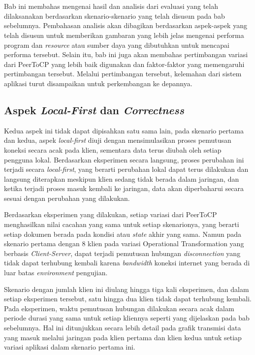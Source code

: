 \chapter{\babLima}
\label{bab:5}

Bab ini membahas mengenai hasil dan analisis dari evaluasi yang telah dilaksanakan berdasarkan skenario-skenario yang telah disusun pada bab sebelumnya. Pembahasan analisis akan dibagikan berdasarkan aspek-aspek yang telah disusun untuk memberikan gambaran yang lebih jelas mengenai performa program dan \textit{resource} atau sumber daya yang dibutuhkan untuk mencapai performa tersebut. Selain itu, bab ini juga akan membahas pertimbangan variasi dari PeerToCP yang lebih baik digunakan dan faktor-faktor yang memengaruhi pertimbangan tersebut. Melalui pertimbangan tersebut, kelemahan dari sistem aplikasi turut disampaikan untuk perkembangan ke depannya.

\section{Aspek \textit{Local-First} dan \textit{Correctness}}

Kedua aspek ini tidak dapat dipisahkan satu sama lain, pada skenario pertama dan kedua, aspek \textit{local-first} diuji dengan mensimulasikan proses pemutusan koneksi secara acak pada klien, sementara data terus diubah oleh setiap pengguna lokal. Berdasarkan eksperimen secara langsung, proses perubahan ini terjadi secara \textit{local-first}, yang berarti perubahan lokal dapat terus dilakukan dan langsung diterapkan meskipun klien sedang tidak berada dalam jaringan, dan ketika terjadi proses masuk kembali ke jaringan, data akan diperbaharui secara sesuai dengan perubahan yang dilakukan.

Berdasarkan eksperimen yang dilakukan, setiap variasi dari PeerToCP menghasilkan nilai cacahan yang sama untuk setiap skenarionya, yang berarti setiap dokumen berada pada kondisi atau \textit{state} akhir yang sama. Namun pada skenario pertama dengan 8 klien pada variasi Operational Transformation yang berbasis \textit{Client-Server}, dapat terjadi pemutusan hubungan \textit{disconnection} yang tidak dapat terhubung kembali karena \textit{bandwidth} koneksi internet yang berada di luar batas \textit{environment} pengujian.

Skenario dengan jumlah klien ini diulang hingga tiga kali eksperimen, dan dalam setiap eksperimen tersebut, satu hingga dua klien tidak dapat terhubung kembali. Pada eksperimen, waktu pemutusan hubungan dilakukan secara acak dalam periode durasi yang sama untuk setiap kliennya seperti yang dijelaskan pada bab sebelumnya. Hal ini ditunjukkan secara lebih detail pada grafik transmisi data yang masuk melalui jaringan pada klien pertama dan klien kedua untuk setiap variasi aplikasi dalam skenario pertama ini.

